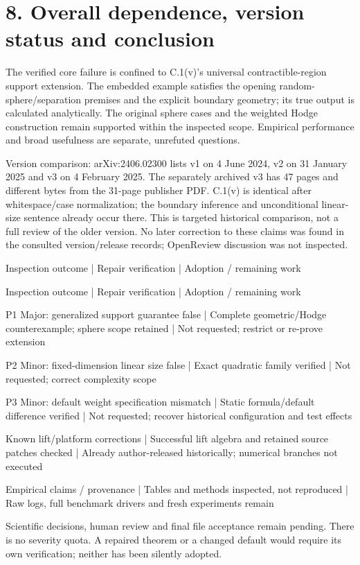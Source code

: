 \documentclass[10pt]{article}
\begin{document}
\section*{8. Overall dependence, version status and conclusion}
The verified core failure is confined to C.1(v)’s universal contractible-region support extension. The embedded example satisfies the opening random-sphere/separation premises and the explicit boundary geometry; its true output is calculated analytically. The original sphere cases and the weighted Hodge construction remain supported within the inspected scope. Empirical performance and broad usefulness are separate, unrefuted questions.\par
Version comparison: arXiv:2406.02300 lists v1 on 4 June 2024, v2 on 31 January 2025 and v3 on 4 February 2025. The separately archived v3 has 47 pages and different bytes from the 31-page publisher PDF. C.1(v) is identical after whitespace/case normalization; the boundary inference and unconditional linear-size sentence already occur there. This is targeted historical comparison, not a full review of the older version. No later correction to these claims was found in the consulted version/release records; OpenReview discussion was not inspected.\par
Inspection outcome | Repair verification | Adoption / remaining work\par
Inspection outcome | Repair verification | Adoption / remaining work\par
P1 Major: generalized support guarantee false | Complete geometric/Hodge counterexample; sphere scope retained | Not requested; restrict or re-prove extension\par
P2 Minor: fixed-dimension linear size false | Exact quadratic family verified | Not requested; correct complexity scope\par
P3 Minor: default weight specification mismatch | Static formula/default difference verified | Not requested; recover historical configuration and test effects\par
Known lift/platform corrections | Successful lift algebra and retained source patches checked | Already author-released historically; numerical branches not executed\par
Empirical claims / provenance | Tables and methods inspected, not reproduced | Raw logs, full benchmark drivers and fresh experiments remain\par
Scientific decisions, human review and final file acceptance remain pending. There is no severity quota. A repaired theorem or a changed default would require its own verification; neither has been silently adopted.\par
\end{document}

